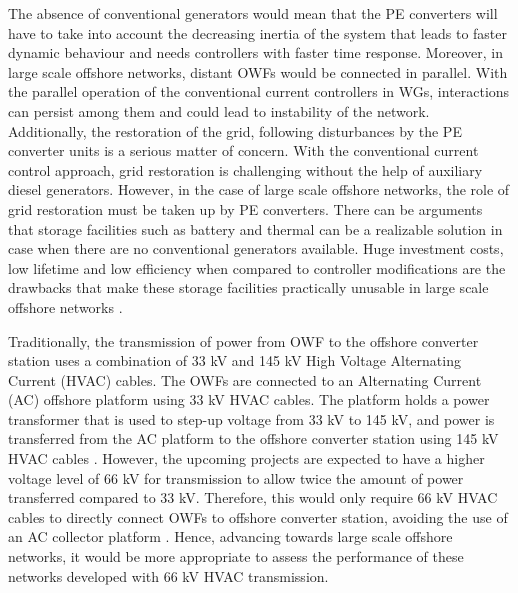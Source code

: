 The absence of conventional generators would mean that the \gls{PE} converters will have to take into account the decreasing inertia of the system that leads to faster dynamic behaviour and needs controllers with faster time response. Moreover, in large scale offshore networks, distant \gls{OWF}s would be connected in parallel. With the parallel operation of the conventional current controllers in \gls{WG}s, interactions can persist among them and could lead to instability of the network. Additionally, the restoration of the grid, following disturbances by the \gls{PE} converter units is a serious matter of concern. With the conventional current control approach, grid restoration is challenging without the help of auxiliary diesel generators. However, in the case of large scale offshore networks, the role of grid restoration must be taken up by \gls{PE} converters. There can be arguments that storage facilities such as battery and thermal can be a realizable solution in case when there are no conventional generators available. Huge investment costs, low lifetime and low efficiency when compared to controller modifications are the drawbacks that make these storage facilities practically unusable in large scale offshore networks \cite{telaretti_economic_2016}.

Traditionally, the transmission of power from \gls{OWF} to the offshore converter station uses a combination of 33 kV and 145 kV High Voltage Alternating Current (\gls{HVAC}) cables. The \gls{OWF}s are connected to an Alternating Current (\gls{AC}) offshore platform using 33 kV \gls{HVAC} cables. The platform holds a power transformer that is used to step-up voltage from 33 kV to 145 kV, and power is transferred from the \gls{AC} platform to the offshore converter station using 145 kV \gls{HVAC} cables \cite{abdelwahed2016power}. However, the upcoming projects are expected to have a higher voltage level of 66 kV for transmission to allow twice the amount of power transferred compared to 33 kV. Therefore, this would only require 66 kV \gls{HVAC} cables to directly connect \gls{OWF}s to offshore converter station, avoiding the use of an \gls{AC} collector platform \cite{dnv66kv}. Hence, advancing towards large scale offshore networks, it would be more appropriate to assess the performance of these networks developed with 66 kV \gls{HVAC} transmission. 


